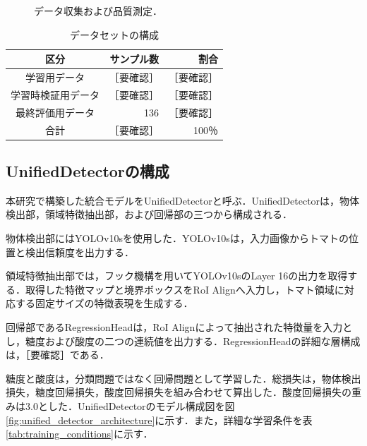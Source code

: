 \documentclass[authorproof,JRM,paper]{fujipressarticle}
\begin{document}
\begin{figure}[t]
\centering
{}
\caption{データ収集および品質測定．}
\label{fig:data_acquisition}
\end{figure}

\begin{table}[t]
	\begin{center}
		\caption{データセットの構成}
		\label{tab:dataset_split}
		\renewcommand{\arraystretch}{1.5}
		\begin{tabular}{|c|r|r|}
			\hline
			\textbf{区分} & \textbf{サンプル数} & \textbf{割合} \\ \hline
			学習用データ & ［要確認］ & ［要確認］ \\ \hline
			学習時検証用データ & ［要確認］ & ［要確認］ \\ \hline
			最終評価用データ & 136 & ［要確認］ \\ \hline
			合計 & ［要確認］ & 100％ \\ \hline
		\end{tabular}
	\end{center}
\end{table}

\subsection{UnifiedDetectorの構成}

本研究で構築した統合モデルをUnifiedDetectorと呼ぶ．UnifiedDetectorは，物体検出部，領域特徴抽出部，および回帰部の三つから構成される．

物体検出部にはYOLOv10sを使用した．YOLOv10sは，入力画像からトマトの位置と検出信頼度を出力する．

領域特徴抽出部では，フック機構を用いてYOLOv10sのLayer 16の出力を取得する．取得した特徴マップと境界ボックスをRoI Alignへ入力し，トマト領域に対応する固定サイズの特徴表現を生成する．

回帰部であるRegressionHeadは，RoI Alignによって抽出された特徴量を入力とし，糖度および酸度の二つの連続値を出力する．RegressionHeadの詳細な層構成は，［要確認］である．

糖度と酸度は，分類問題ではなく回帰問題として学習した．総損失は，物体検出損失，糖度回帰損失，酸度回帰損失を組み合わせて算出した．酸度回帰損失の重みは3.0とした．UnifiedDetectorのモデル構成図を図\ref{fig:unified_detector_architecture}に示す．また，詳細な学習条件を表\ref{tab:training_conditions}に示す．
\end{document}
